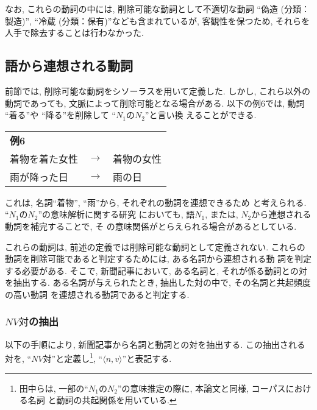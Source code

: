なお, これらの動詞の中には, 削除可能な動詞として不適切な動詞
``偽造 (分類：製造)'', ``冷蔵 (分類：保有)''なども含まれているが, 
客観性を保つため, それらを人手で除去することは行わなかった.

\subsection{語から連想される動詞}\label{rensou}
前節では, 削除可能な動詞をシソーラスを用いて定義した. 
しかし, これら以外の動詞であっても, 文脈によって削除可能となる場合がある. 
以下の例6では, 動詞 ``着る''や ``降る''を削除して ``$N_1のN_2$''と言い換
えることができる. 
\begin{center}
 \begin{tabular}{lcl}
  {\bf 例6}&&\\
着物を着た女性 & $\to$ & 着物の女性\\
雨が降った日 & $\to$ & 雨の日
 \end{tabular}
\end{center}
これは, 名詞``着物'', ``雨''から, それぞれの動詞を連想できるため
と考えられる. 
``$N_1のN_2$''の意味解析に関する研究
\cite{hirai86,kurohashi99,shimadu85,tanaka98b}
においても, 語$N_1$, または, $N_2$から連想される動詞を補完することで, そ
の意味関係がとらえられる場合があるとしている. 

これらの動詞は, 前述の定義では削除可能な動詞として定義されない. 
これらの動詞を削除可能であると判定するためには, ある名詞から連想される動
詞を判定する必要がある. 
そこで, 新聞記事において, ある名詞と, それが係る動詞との対を抽出する.  
ある名詞が与えられたとき, 抽出した対の中で, その名詞と共起頻度の高い動詞
を連想される動詞であると判定する.

\subsubsection{$NV対$の抽出}\label{nvchushutsu}
以下の手順により, 新聞記事から名詞と動詞との対を抽出する. 
この抽出される対を, ``$NV対$''と定義し\footnote{田中ら\cite{tanaka98b}は, 
一部の``$N_1のN_2$''の意味推定の際に, 本論文と同様, コーパスにおける名詞
と動詞の共起関係を用いている.}, ``$\langle n, v \rangle$''と表記する.

